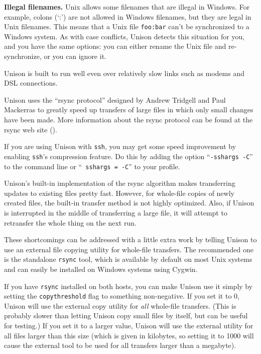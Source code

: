 \documentclass{article}
\begin{document}
\textbf{Illegal filenames.}  Unix allows some filenames that are
illegal in Windows.  For example, colons (`:') are not allowed in
Windows filenames, but they are legal in Unix filenames.  This means
that a Unix file \texttt{foo:bar} can't be synchronized to a Windows
system.  As with case conflicts, Unison detects this situation for
you, and you have the same options: you can either rename the Unix
file and re-synchronize, or you can ignore it.



Unison is built to run well even over relatively slow links such as
modems and DSL connections.  

Unison uses the ``rsync protocol'' designed by Andrew Tridgell and Paul
Mackerras to greatly speed up transfers of large files in which only
small changes have been made.  More information about the rsync protocol
can be found at the rsync web site ().

If you are using Unison with {\tt ssh}, you may get some speed
improvement by enabling {\tt ssh}'s compression feature.  Do this by
adding the option ``{\tt -sshargs -C}'' to the command line or ``{\tt
  sshargs = -C}'' to your profile.  



Unison's built-in implementation of the rsync algorithm makes transferring
updates to existing files pretty fast.  However, for whole-file copies of
newly created files, the built-in transfer method is not highly optimized.
Also, if Unison is interrupted in the middle of transferring a large file,
it will attempt to retransfer the whole thing on the next run.

These shortcomings can be addressed with a little extra work by telling
Unison to use an external file copying utility for whole-file transfers.
The recommended one is the standalone {\tt rsync} tool, which is available
by default on most Unix systems and can easily be installed on Windows
systems using Cygwin.

If you have {\tt rsync} installed on both hosts, you can make Unison use it
simply by setting the {\tt copythreshold} flag to something non-negative.
If you set it to 0, Unison will use the external copy utility for {\em all}
whole-file transfers.  (This is probably slower than letting Unison copy
small files by itself, but can be useful for testing.)  If you set it to a
larger value, Unison will use the external utility for all files larger than
this size (which is given in kilobytes, so setting it to 1000 will cause the
external tool to be used for all transfers larger than a megabyte).
\end{document}
